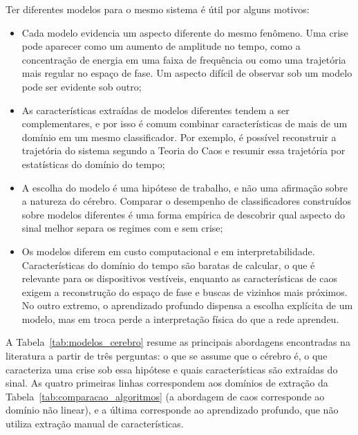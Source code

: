 \documentclass[]{article}
\begin{document}
	Ter diferentes modelos para o mesmo sistema é útil por alguns motivos:
	\begin{itemize}
		\item Cada modelo evidencia um aspecto diferente do mesmo fenômeno. Uma crise pode aparecer como um aumento de amplitude no tempo, como a concentração de energia em uma faixa de frequência ou como uma trajetória mais regular no espaço de fase. Um aspecto difícil de observar sob um modelo pode ser evidente sob outro;
		\item As características extraídas de modelos diferentes tendem a ser complementares, e por isso é comum combinar características de mais de um domínio em um mesmo classificador. Por exemplo, é possível reconstruir a trajetória do sistema segundo a Teoria do Caos e resumir essa trajetória por estatísticas do domínio do tempo;
		\item A escolha do modelo é uma hipótese de trabalho, e não uma afirmação sobre a natureza do cérebro. Comparar o desempenho de classificadores construídos sobre modelos diferentes é uma forma empírica de descobrir qual aspecto do sinal melhor separa os regimes com e sem crise;
		\item Os modelos diferem em custo computacional e em interpretabilidade. Características do domínio do tempo são baratas de calcular, o que é relevante para os dispositivos vestíveis, enquanto as características de caos exigem a reconstrução do espaço de fase e buscas de vizinhos mais próximos. No outro extremo, o aprendizado profundo dispensa a escolha explícita de um modelo, mas em troca perde a interpretação física do que a rede aprendeu.
	\end{itemize}

	A Tabela~\ref{tab:modelos_cerebro} resume as principais abordagens encontradas na literatura a partir de três perguntas: o que se assume que o cérebro é, o que caracteriza uma crise sob essa hipótese e quais características são extraídas do sinal. As quatro primeiras linhas correspondem aos domínios de extração da Tabela~\ref{tab:comparacao_algoritmos} (a abordagem de caos corresponde ao domínio não linear), e a última corresponde ao aprendizado profundo, que não utiliza extração manual de características.
\end{document}
